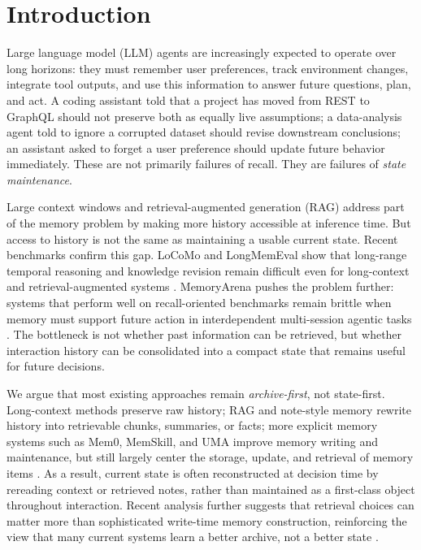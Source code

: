 \section{Introduction}
Large language model (LLM) agents are increasingly expected to operate over long horizons: they must remember user preferences, track environment changes, integrate tool outputs, and use this information to answer future questions, plan, and act.
A coding assistant told that a project has moved from REST to GraphQL should not preserve both as equally live assumptions; a data-analysis agent told to ignore a corrupted dataset should revise downstream conclusions; an assistant asked to forget a user preference should update future behavior immediately. These are not primarily failures of recall. They are failures of \emph{state maintenance}.

Large context windows and retrieval-augmented generation (RAG) address part of the memory problem by making more history accessible at inference time. But access to history is not the same as maintaining a usable current state. Recent benchmarks confirm this gap. LoCoMo and LongMemEval show that long-range temporal reasoning and knowledge revision remain difficult even for long-context and retrieval-augmented systems \cite{maharana2024locomo,wu2025longmemeval}. MemoryArena pushes the problem further: systems that perform well on recall-oriented benchmarks remain brittle when memory must support future action in interdependent multi-session agentic tasks \cite{he2026memoryarena}. The bottleneck is not whether past information can be retrieved, but whether interaction history can be consolidated into a compact state that remains useful for future decisions.

We argue that most existing approaches remain \emph{archive-first}, not state-first. Long-context methods preserve raw history; RAG and note-style memory rewrite history into retrievable chunks, summaries, or facts; more explicit memory systems such as Mem0, MemSkill, and UMA improve memory writing and maintenance, but still largely center the storage, update, and retrieval of memory items \cite{chhikara2025mem0,zhang2026memskill,zhang2026uma}. As a result, current state is often reconstructed at decision time by rereading context or retrieved notes, rather than maintained as a first-class object throughout interaction. Recent analysis further suggests that retrieval choices can matter more than sophisticated write-time memory construction, reinforcing the view that many current systems learn a better archive, not a better state \cite{yuan2026diagnosing}.

